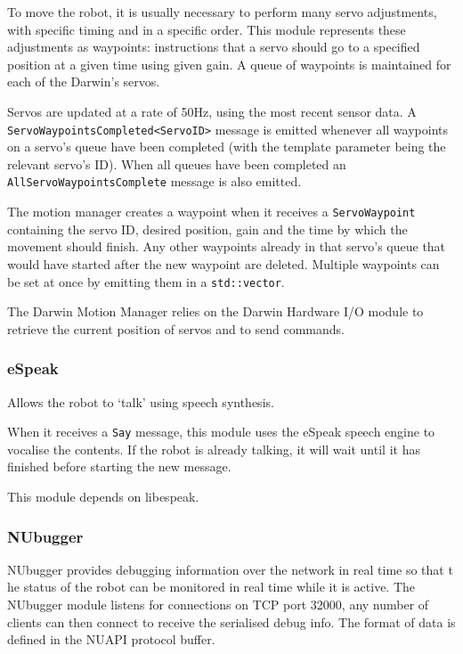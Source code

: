 \documentclass[english,12pt]{scrartcl}
\begin{document}
				To move the robot, it is usually necessary to perform many servo adjustments,
				with specific timing and in a specific order. This module represents these
				adjustments as waypoints: instructions that a servo should go to a specified
				position at a given time using given gain. A queue of waypoints is maintained
				for each of the Darwin's servos.

				Servos are updated at a rate of 50Hz, using the most recent sensor data.
				A \texttt{ServoWaypointsCompleted<ServoID>} message is emitted whenever all waypoints on a servo's queue have been completed (with the template parameter being the relevant servo's ID).
				When all queues have been completed an \texttt{AllServoWaypointsComplete} message is also emitted.

				The motion manager creates a waypoint when it receives a \texttt{ServoWaypoint}
				containing the servo ID, desired position, gain and the time by which the movement should finish. Any other waypoints already in that servo's queue that
				would have started after the new waypoint are deleted. Multiple waypoints can be
				set at once by emitting them in a \texttt{std::vector}.

				The Darwin Motion Manager relies on the Darwin Hardware I/O module to retrieve
				the current position of servos and to send commands.

			\subsubsection{eSpeak}
				Allows the robot to `talk' using speech synthesis.

				When it receives a \texttt{Say} message, this module uses the eSpeak speech engine
				to vocalise the contents. If the robot is already talking, it will wait until it
				has finished before starting the new message.

				This module depends on libespeak.


			\subsubsection{NUbugger}
				NUbugger provides debugging information over the network in real time so that t
				he status of the robot can be monitored in real time while it is active. The
				NUbugger module listens for connections on TCP port 32000, any number of
				clients can then connect to receive the serialised debug info. The format of
				data is defined in the NUAPI protocol buffer.
\end{document}
